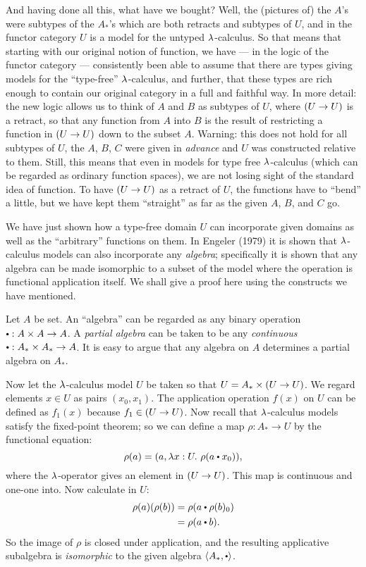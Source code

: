 And having done all this, what have we bought? Well, the (pictures of) the $A$'s were
subtypes of the $A_*$'s which are both retracts and subtypes of $U$, and in the functor
category $U$ is a model for the untyped $\lambda$-calculus. So that means that starting with
our original notion of function, we have --- in the logic of the functor category ---
consistently been able to assume that there are types giving models for the ``type-free''
$\lambda$-calculus, and further, that these types are rich enough to contain our original
category in a full and faithful way. In more detail: the new logic allows us to think of
$A$ and $B$ as subtypes of $U$, where $(U\rightarrow U)$ is a retract, so that any function from $A$
into $B$ is the result of restricting a function in $(U\rightarrow U)$ down to the subset $A$. Warning:
this does not hold for all subtypes of $U$, the $A$, $B$, $C$ were given in {\it advance}
and $U$ was constructed relative to them. Still, this means that even in models for type
free $\lambda$-calculus (which can be regarded as ordinary function spaces), we are not losing
sight of the standard idea of function. To have $(U\rightarrow U)$ as a retract of $U$, the functions
have to ``bend'' a little, but we have kept them ``straight'' as far as the given $A$,
$B$, and $C$ go.

We have just shown how a type-free domain $U$ can incorporate given domains as well as the
``arbitrary'' functions on them. In Engeler (1979) it is shown that $\lambda$-calculus models
can also incorporate any {\it algebra}; specifically it is shown that any algebra can be
made isomorphic to a subset of the model where the operation is functional application
itself. We shall give a proof here using the constructs we have mentioned.

Let $A$ be set. An ``algebra'' can be regarded as any binary operation $\dotop :  A\times
A\to A$. A {\it partial algebra} can be taken to be any {\it continuous} $\dotop : A_* \times A_* \to
A$. It is easy to argue that any algebra on $A$ determines a partial algebra on $A_*$.

Now let the $\lambda$-calculus model $U$ be taken so that $U = A_* \times  (U\rightarrow U)$. We regard
elements $x \in U$ as pairs $(x_0 , x_1 )$. The application operation $f(x)$ on $U$ can be
defined as $f_1(x)$ because $f_1 \in (U\rightarrow U)$. Now recall that $\lambda$-calculus models satisfy
the fixed-point theorem; so we can define a map $\rho: A_*\to U$ by the functional
equation:
$$
\rho(a)  =  (a, \l x: U. \,\,\rho (a \dotop x_0)) ,
$$
where the $\lambda$-operator gives an element in $(U\rightarrow U)$. This map is continuous and one-one
into. Now calculate in $U$:
\begin{align*}
\rho(a)(\rho(b)) &= \rho(a\dotop \rho(b)_0)\\
&= \rho( a  \dotop  b) .
\end{align*}
So the image of $\rho$ is closed under application, and the resulting applicative
subalgebra is {\it isomorphic} to the given algebra $\langle A_*, \dotop \rangle$.

